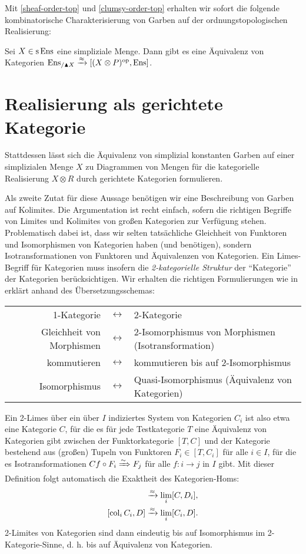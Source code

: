Mit \ref{sheaf-order-top} und \ref{clumsy-order-top} erhalten wir
sofort die folgende kombinatorische Charakterisierung von Garben auf
der ordnungstopologischen Realisierung:
\begin{prop} \label{clumsy-comb}
  Sei $X \in \operatorname{s}\operatorname{Ens}$ eine simpliziale Menge. Dann gibt es eine
  Äquivalenz von Kategorien $\operatorname{Ens}_{/\blacktriangle X} \xrightarrow{\approx} [(X
    \otimes P)^\mathrm{op}, \operatorname{Ens}]$.
\end{prop}

\section{Realisierung als gerichtete Kategorie}
\label{sec:real-directed-cat}

Stattdessen lässt sich die Äquivalenz von simplizial konstanten Garben
auf einer simplizialen Menge $X$ zu Diagrammen von Mengen für die
kategorielle Realisierung $X \otimes R$ durch gerichtete Kategorien
formulieren.

Als zweite Zutat für diese Aussage benötigen wir eine Beschreibung von
Garben auf Kolimites. Die Argumentation ist recht einfach, sofern die
richtigen Begriffe von Limites und Kolimites von großen Kategorien zur
Verfügung stehen. Problematisch dabei ist, dass wir selten
tatsächliche Gleichheit von Funktoren und Isomorphismen von Kategorien
haben (und benötigen), sondern Isotransformationen von Funktoren und
Äquivalenzen von Kategorien. Ein Limes-Begriff für Kategorien muss
insofern die \emph{2-kategorielle Struktur} der ``Kategorie'' der
Kategorien berücksichtigen. Wir erhalten die richtigen Formulierungen
wie in \cite{nlab:2-limit} erklärt anhand des Übersetzungsschemas:
\renewcommand{\arraystretch}{1.5}
\begin{center}
    \begin{tabulary}{\textwidth}{RCL}
    1-Kategorie & $\leftrightarrow$
    & 2-Kategorie \\
    Gleichheit von Morphismen & $\leftrightarrow$
    & 2-Isomorphismus von Morphismen (Isotransformation) \\
    kommutieren & $\leftrightarrow$
    & kommutieren bis auf 2-Isomorphismus \\
    Isomorphismus & $\leftrightarrow$
    & Quasi-Isomorphismus (Äquivalenz von Kategorien)  
  \end{tabulary}
\end{center}
Ein 2-Limes über ein über $I$ indiziertes System von Kategorien $C_i$
ist also etwa eine Kategorie $C$, für die es für jede Testkategorie
$T$ eine Äquivalenz von Kategorien gibt zwischen der Funktorkategorie
$[T, C]$ und der Kategorie bestehend aus (großen) Tupeln von Funktoren
$F_i \in [T, C_i]$ für alle $i \in I$, für die es Isotransformationen
$Cf \circ F_i \xRightarrow{\sim} F_j$ für alle $f: i \to j$ in $I$ gibt. Mit
dieser Definition folgt automatisch die Exaktheit des Kategorien-Homs:
\begin{align*}
  [C, \lim_i D_i] &\qiso \lim_i [C, D_i], \\
  [\col_i C_i, D] &\qiso \lim_i [C_i, D].
\end{align*}
2-Limites von Kategorien sind dann eindeutig bis auf Isomorphismus im
2-Kategorie-Sinne, d. h. bis auf Äquivalenz von Kategorien.


